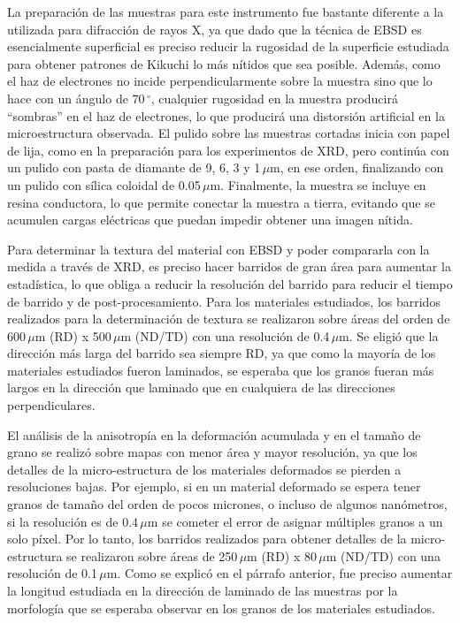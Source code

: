 La preparación de las muestras para este instrumento fue bastante diferente a la utilizada para difracción de rayos X, ya que dado que la técnica de EBSD es esencialmente superficial es preciso reducir la rugosidad de la superficie estudiada para obtener patrones de Kikuchi lo más nítidos que sea posible.
Además, como el haz de electrones no incide perpendicularmente sobre la muestra sino que lo hace con un ángulo de 70\,$^{\circ}$, cualquier rugosidad en la muestra producirá ``sombras'' en el haz de electrones, lo que producirá una distorsión artificial en la microestructura observada.
El pulido sobre las muestras cortadas inicia con papel de lija, como en la preparación para los experimentos de XRD, pero continúa con un pulido con pasta de diamante de 9, 6, 3 y 1\,$\mu$m, en ese orden, finalizando con un pulido con sílica coloidal de 0.05\,$\mu$m.
Finalmente, la muestra se incluye en resina conductora, lo que permite conectar la muestra a tierra, evitando que se acumulen cargas eléctricas que puedan impedir obtener una imagen nítida.

Para determinar la textura del material con EBSD y poder compararla con la medida a través de XRD, es preciso hacer barridos de gran área para aumentar la estadística, lo que obliga a reducir la resolución del barrido para reducir el tiempo de barrido y de post-procesamiento.
Para los materiales estudiados, los barridos realizados para la determinación de textura se realizaron sobre áreas del orden de 600\,$\mu$m (RD) x 500\,$\mu$m (ND/TD) con una resolución de 0.4\,$\mu$m.
Se eligió que la dirección más larga del barrido sea siempre RD, ya que como la mayoría de los materiales estudiados fueron laminados, se esperaba que los granos fueran más largos en la dirección que laminado que en cualquiera de las direcciones perpendiculares.

El análisis de la anisotropía en la deformación acumulada y en el tamaño de grano se realizó sobre mapas con menor área y mayor resolución, ya que los detalles de la micro-estructura de los materiales deformados se pierden a resoluciones bajas.
Por ejemplo, si en un material deformado se espera tener granos de tamaño del orden de pocos micrones, o incluso de algunos nanómetros, si la resolución es de 0.4\,$\mu$m se cometer el error de asignar múltiples granos a un solo píxel.
Por lo tanto, los barridos realizados para obtener detalles de la micro-estructura se realizaron sobre áreas de 250\,$\mu$m (RD) x 80\,$\mu$m (ND/TD) con una resolución de 0.1\,$\mu$m.
Como se explicó en el párrafo anterior, fue preciso aumentar la longitud estudiada en la dirección de laminado de las muestras por la morfología que se esperaba observar en los granos de los materiales estudiados.

